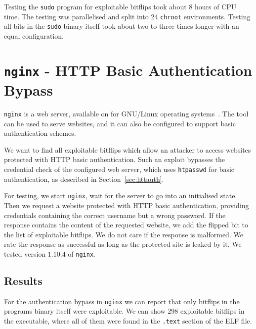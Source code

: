 Testing the \texttt{sudo} program for exploitable bitflips took about \num{8}
hours of CPU time. The testing was parallelised and split into \num{24}
\texttt{chroot} environments. Testing all bits in the \texttt{sudo} binary
itself took about two to three times longer with an equal configuration.

\section{\texttt{nginx} - HTTP Basic Authentication Bypass}

\texttt{nginx} is a web server, available on for GNU/Linux operating
systems~\cite{nginxweb}. The tool can be used to serve websites, and it can
also be configured to support basic authentication schemes.

We want to find all exploitable bitflips which allow an attacker to access
websites protected with HTTP basic authentication. Such an exploit bypasses
the credential check of the configured web server, which uses \texttt{htpasswd}
for basic authentication, as described in Section~\ref{sec:httauth}.

For testing, we start \texttt{nginx}, wait for the server to go into an
initialised state. Then we request a website protected with HTTP basic
authentication, providing credentials containing the correct
username but a wrong password. If the response contains the content of the
requested website, we add the flipped bit to the list of exploitable bitflips.
We do not care if the response is malformed. We rate the response as successful
as long as the protected site is leaked by it. We tested version $1.10.4$ of
\texttt{nginx}.

\subsection{Results}

For the authentication bypass in \texttt{nginx} we can report that only bitflips
in the program\textquotesingle s binary itself were exploitable. We can show
\num{298} exploitable bitflips in the executable, where all of them were found
in the \texttt{.text} section of the ELF file.

